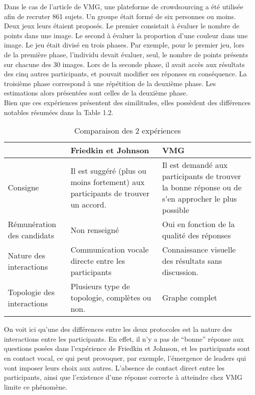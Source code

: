 \documentclass{scrreprt}
\begin{document}
Dans le cas de l’article de VMG, une plateforme de crowdsourcing a été utilisée afin de recruter 861 sujets. Un groupe était formé de six personnes ou moins. Deux jeux leurs étaient proposés. Le premier consistait à évaluer le nombre de points dans une image. Le second à évaluer la proportion d'une couleur dans une image. Le jeu était divisé en trois phases. Par exemple, pour le premier jeu, lors de la première phase, l'individu devait évaluer, seul, le nombre de points présents sur chacune des 30 images. Lors de la seconde phase, il avait accès aux résultats des cinq autres participants, et pouvait modifier ses réponses en conséquence. La troisième phase correspond à une répétition de la deuxième phase. Les estimations alors présentées sont celles de la deuxième phase. \\

Bien que ces expériences présentent des similitudes, elles possèdent des différences notables résumées dans la Table 1.2.\\

\begin{table}
	\begin{tabular}{|p{4cm}|p{4.5cm}|p{4.5cm}|}
		\hline
 & Friedkin et Johnson & VMG \tabularnewline
		\hline
Consigne & Il est suggéré (plus ou moins fortement) aux participants de trouver un accord. &Il est demandé aux participants de trouver la bonne réponse ou de s’en approcher le plus possible\tabularnewline
		\hline
Rémunération des candidats & Non renseigné & Oui en fonction de la qualité des réponses \tabularnewline
		\hline
Nature des interactions & Communication vocale directe entre les participants & Connaissance visuelle des résultats sans discussion.\tabularnewline
		\hline
Topologie des interactions & Plusieurs type de topologie, complètes ou non. & Graphe complet\tabularnewline
		\hline
	\end{tabular}
	\caption{Comparaison des 2 expériences}
\end{table}

On voit ici qu'une des différences entre les deux protocoles est la nature des interactions entre les participants. En effet, il n’y a pas de “bonne” réponse aux questions posées dans l'expérience de Friedkin et Johnson, et les participants sont en contact vocal, ce qui peut provoquer, par exemple, l’émergence de leaders qui vont imposer leurs choix aux autres. L’absence de contact direct entre les participants, ainsi que l’existence d’une réponse correcte à atteindre chez VMG limite ce phénomène.\\
\end{document}
